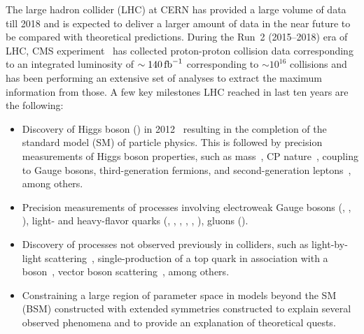 \documentclass[a4paper,11pt]{article}
\newcommand{\Pb}{{{\Pqb}}\xspace}
\newcommand{\Pt}{{{\Pqt}}\xspace}
\newcommand{\Ps}{{{\Pqs}}\xspace}
\newcommand{\Pc}{{{\Pqc}}\xspace}
\newcommand{\Pd}{{{\Pqd}}\xspace}
\newcommand{\Pu}{{{\Pqu}}\xspace}
\begin{document}
The large hadron collider (LHC) at CERN has provided a large volume of data till 2018
and is expected to deliver a larger amount of data in the near future
to be compared with theoretical predictions. 
During the Run~2 (2015--2018) era of LHC, CMS experiment~\cite{CMS_ex} has collected proton-proton collision data corresponding to an integrated luminosity of $\sim 140\mbox{\ensuremath{\,\text{fb}^{-1}}}$ corresponding to $\sim 10^{16}$ collisions and has been performing an extensive set of analyses to extract the maximum information from those.
A few key milestones LHC reached in last ten years are the following:
\begin{itemize}
\item Discovery of Higgs boson (\PH) in 2012~\cite{Aad:2012tfa,Chatrchyan:2012ufa} resulting in the completion of the standard model (SM) of particle physics. 
This is followed by precision measurements of Higgs boson properties, such as mass~\cite{CMS:2017dib,CMS:2020xrn}, CP nature~\cite{CMS:2019jdw,CMS:2020cga}, coupling to Gauge bosons, third-generation fermions, and second-generation leptons~\cite{CMS-PAS-HIG-19-005}, among others.
\item Precision measurements of processes involving electroweak Gauge bosons (\PW, \PZ, \Pgg), light- and heavy-flavor quarks (\Pu, \Pd, \Ps, \Pc, \Pb, \Pt), gluons (\Pg).
\item Discovery of processes not observed previously in colliders, such as light-by-light scattering~\cite{CMS:2018erd}, single-production of a top quark in association with a \PZ boson~\cite{CMS:2018sgc}, vector boson scattering~\cite{CMS:2017fhs}, among others.
\item Constraining a large region of parameter space in models beyond the SM (BSM) constructed with extended symmetries 
constructed to explain several observed phenomena and to provide an explanation of theoretical quests.
\end{itemize}
\end{document}
